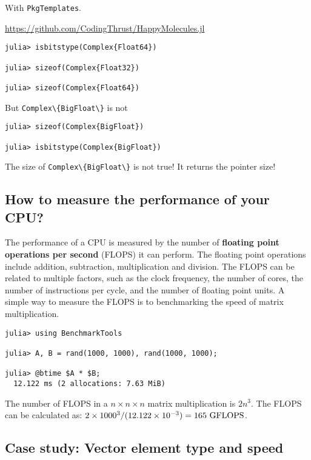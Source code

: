 \documentclass[
  notoc %
]{tufte-book}
\newcommand{\passthrough}[1]{#1}
\begin{document}
With \passthrough{\lstinline!PkgTemplates!}.

\url{https://github.com/CodingThrust/HappyMolecules.jl}

\begin{lstlisting}
julia> isbitstype(Complex{Float64})

julia> sizeof(Complex{Float32})

julia> sizeof(Complex{Float64})
\end{lstlisting}

But \passthrough{\lstinline!Complex\{BigFloat\}!} is not

\begin{lstlisting}
julia> sizeof(Complex{BigFloat})

julia> isbitstype(Complex{BigFloat})
\end{lstlisting}

The size of \passthrough{\lstinline!Complex\{BigFloat\}!} is not true!
It returns the pointer size!

\hypertarget{how-to-measure-the-performance-of-your-cpu}{%
\subsection{How to measure the performance of your
CPU?}\label{how-to-measure-the-performance-of-your-cpu}}

The performance of a CPU is measured by the number of \textbf{floating
point operations per second} (FLOPS) it can perform. The floating point
operations include addition, subtraction, multiplication and division.
The FLOPS can be related to multiple factors, such as the clock
frequency, the number of cores, the number of instructions per cycle,
and the number of floating point units. A simple way to measure the
FLOPS is to benchmarking the speed of matrix multiplication.

\begin{lstlisting}
julia> using BenchmarkTools

julia> A, B = rand(1000, 1000), rand(1000, 1000);

julia> @btime $A * $B;
  12.122 ms (2 allocations: 7.63 MiB)
\end{lstlisting}

The number of FLOPS in a \(n\times n\times n\) matrix multiplication is
\(2n^3\). The FLOPS can be calculated as:
\(2 \times 1000^3 / (12.122 \times 10^{-3}) = 165~{\rm GFLOPS}\).

\hypertarget{case-study-vector-element-type-and-speed}{%
\subsection{Case study: Vector element type and
speed}\label{case-study-vector-element-type-and-speed}}
\end{document}
